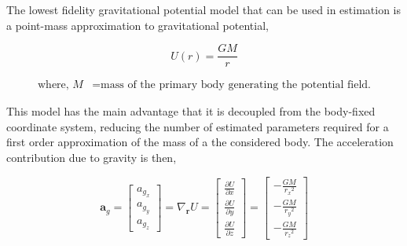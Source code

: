 The lowest fidelity gravitational potential model that can be used in estimation
is a point-mass approximation to gravitational potential,

\begin{equation}
    U(r)=\frac{GM}{r}
\end{equation}

\begin{equation*}
    \begin{aligned}
        \textrm{where, } M &= \textrm{mass of the primary body generating the potential field.}
    \end{aligned}
\end{equation*}

This model has the main advantage that it is decoupled from the body-fixed
coordinate system, reducing the number of estimated parameters required for a
first order approximation of the mass of a the considered body. The acceleration
contribution due to gravity is then,

\begin{equation}
    \bm{a}_g=
    \begin{bmatrix}
        a_{g_x} \\
        a_{g_y} \\
        a_{g_z}
    \end{bmatrix}
    =
    \nabla_\mathbf{r}{U}
    =
    \begin{bmatrix}
        \frac{\partial{U}}{\partial{x}} \\
        \frac{\partial{U}}{\partial{y}} \\
        \frac{\partial{U}}{\partial{z}}
    \end{bmatrix}
    =
    \begin{bmatrix}
        -\frac{GM}{{r_x}^2} \\
        -\frac{GM}{{r_y}^2} \\
        -\frac{GM}{{r_z}^2}
    \end{bmatrix}
\end{equation}



